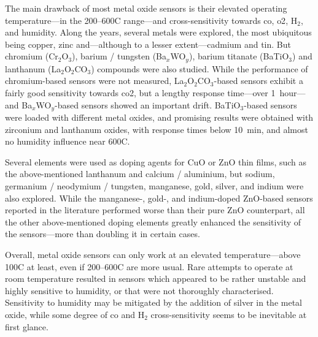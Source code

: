 The main drawback of most metal oxide sensors is their elevated operating temperature---in the 200--600{\degree}C range---and cross-sensitivity towards \gls{co}, \gls{o2}, H$_2$, and humidity. Along the years, several metals were explored, the most ubiquitous being copper, zinc and---although to a lesser extent---cadmium and tin. But chromium (Cr$_2$O$_3$)\cite{seiferth1999}, barium / tungsten (Ba$_x$WO$_y$)\cite{cavanagh2011}, barium titanate (BaTiO$_3$)\cite{haeusler1996} and lanthanum (La$_2$O$_2$CO$_3$)\cite{chen2014} compounds were also studied. While the performance of chromium-based sensors were not measured, La$_2$O$_2$CO$_3$-based sensors exhibit a fairly good sensitivity towards \gls{co2}, but a lengthy response time---over 1~hour---and Ba$_x$WO$_y$-based sensors showed an important drift. BaTiO$_3$-based sensors were loaded with different metal oxides, and promising results were obtained with zirconium and lanthanum oxides, with response times below 10~min, and almost no humidity influence near 600{\degree}C\cite{haeusler1996}.

Several elements were used as doping agents for CuO or ZnO thin films, such as the above-mentioned lanthanum and calcium / aluminium, but sodium\cite{basyooni2017}, germanium / neodymium / tungsten\cite{colak2019}, manganese\cite{ghanbarishohany2018}, gold\cite{alvarez2020}, silver\cite{ishihara1993, herran2009}, and indium\cite{shokryhassan2014} were also explored. While the manganese-, gold-, and indium-doped ZnO-based sensors reported in the literature performed worse than their pure ZnO counterpart, all the other above-mentioned doping elements greatly enhanced the sensitivity of the sensors---more than doubling it in certain cases\cite{ghosh2019}.

Overall, metal oxide sensors can only work at an elevated temperature---above 100{\degree}C at least, even if 200--600{\degree}C are more usual. Rare attempts to operate at room temperature resulted in sensors which appeared to be rather unstable and highly sensitive to humidity\cite{tanvir2015a, tanvir2015b}, or that were not thoroughly characterised\cite{basyooni2017, alvarez2020}. Sensitivity to humidity may be mitigated by the addition of silver in the metal oxide\cite{haeusler1996, ishihara1995}, while some degree of \gls{co} and H$_2$ cross-sensitivity seems to be inevitable at first glance.

